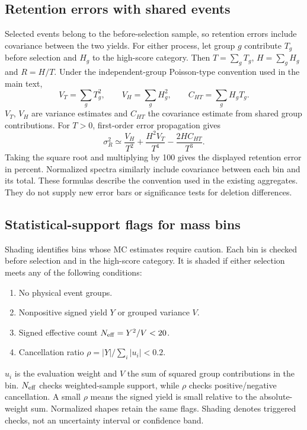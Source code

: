 \documentclass[11pt,a4paper]{article}
\begin{document}
\subsection{Retention errors with shared events}
Selected events belong to the before-selection sample, so retention errors include covariance between the two yields.
For either process, let group $g$ contribute $T_g$ before selection and $H_g$ to the high-score category.
Then $T=\sum_gT_g$, $H=\sum_gH_g$ and $R=H/T$.
Under the independent-group Poisson-type convention used in the main text,
\[
 V_T=\sum_g T_g^2,\qquad V_H=\sum_g H_g^2,\qquad C_{HT}=\sum_g H_gT_g.
\]
$V_T$, $V_H$ are variance estimates and $C_{HT}$ the covariance estimate from shared group contributions.
For $T>0$, first-order error propagation gives
\[
 \sigma_R^2\simeq\frac{V_H}{T^2}+\frac{H^2V_T}{T^4}-\frac{2H C_{HT}}{T^3}.
\]
Taking the square root and multiplying by 100 gives the displayed retention error in percent.
Normalized spectra similarly include covariance between each bin and its total.
These formulas describe the convention used in the existing aggregates. They do not supply new error bars or significance tests for deletion differences.

\subsection{Statistical-support flags for mass bins}
Shading identifies bins whose MC estimates require caution.
Each bin is checked before selection and in the high-score category. It is shaded if either selection meets any of the following conditions:
\begin{enumerate}[leftmargin=1.7em,itemsep=2pt]
\item No physical event groups.
\item Nonpositive signed yield $Y$ or grouped variance $V$.
\item Signed effective count $N_{\rm eff}=Y^2/V<20$.
\item Cancellation ratio $\rho=|Y|/\sum_i|u_i|<0.2$.
\end{enumerate}
$u_i$ is the evaluation weight and $V$ the sum of squared group contributions in the bin.
$N_{\rm eff}$ checks weighted-sample support, while $\rho$ checks positive/negative cancellation.
A small $\rho$ means the signed yield is small relative to the absolute-weight sum.
Normalized shapes retain the same flags.
Shading denotes triggered checks, not an uncertainty interval or confidence band.
\end{document}
